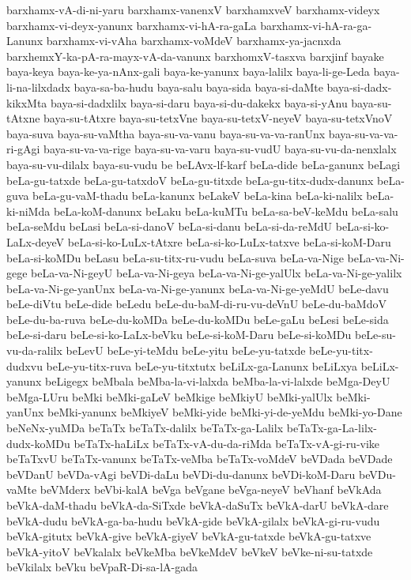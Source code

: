 {barxhamx-vA-di-ni-yaru
barxhamx-vanenxV
barxhamxveV
barxhamx-videyx
barxhamx-vi-deyx-yanunx
barxhamx-vi-hA-ra-gaLa
barxhamx-vi-hA-ra-ga-Lanunx
barxhamx-vi-vAha
barxhamx-voMdeV
barxhamx-ya-jacnxda
barxhemxY-ka-pA-ra-mayx-vA-da-vanunx
barxhomxV-tasxva
barxjinf
bayake
baya-keya
baya-ke-ya-nAnx-gali
baya-ke-yanunx
baya-lalilx
baya-li-ge-Leda
baya-li-na-lilxdadx
baya-sa-ba-hudu
baya-salu
baya-sida
baya-si-daMte
baya-si-dadx-kikxMta
baya-si-dadxlilx
baya-si-daru
baya-si-du-dakekx
baya-si-yAnu
baya-su-tAtxne
baya-su-tAtxre
baya-su-tetxVne
baya-su-tetxV-neyeV
baya-su-tetxVnoV
baya-suva
baya-su-vaMtha
baya-su-va-vanu
baya-su-va-va-ranUnx
baya-su-va-va-ri-gAgi
baya-su-va-va-rige
baya-su-va-varu
baya-su-vudU
baya-su-vu-da-nenxlalx
baya-su-vu-dilalx
baya-su-vudu
be
beLAvx-lf-karf
beLa-dide
beLa-ganunx
beLagi
beLa-gu-tatxde
beLa-gu-tatxdoV
beLa-gu-titxde
beLa-gu-titx-dudx-danunx
beLa-guva
beLa-gu-vaM-thadu
beLa-kanunx
beLakeV
beLa-kina
beLa-ki-nalilx
beLa-ki-niMda
beLa-koM-danunx
beLaku
beLa-kuMTu
beLa-sa-beV-keMdu
beLa-salu
beLa-seMdu
beLasi
beLa-si-danoV
beLa-si-danu
beLa-si-da-reMdU
beLa-si-ko-LaLx-deyeV
beLa-si-ko-LuLx-tAtxre
beLa-si-ko-LuLx-tatxve
beLa-si-koM-Daru
beLa-si-koMDu
beLasu
beLa-su-titx-ru-vudu
beLa-suva
beLa-va-Nige
beLa-va-Ni-gege
beLa-va-Ni-geyU
beLa-va-Ni-geya
beLa-va-Ni-ge-yalUlx
beLa-va-Ni-ge-yalilx
beLa-va-Ni-ge-yanUnx
beLa-va-Ni-ge-yanunx
beLa-va-Ni-ge-yeMdU
beLe-davu
beLe-diVtu
beLe-dide
beLedu
beLe-du-baM-di-ru-vu-deVnU
beLe-du-baMdoV
beLe-du-ba-ruva
beLe-du-koMDa
beLe-du-koMDu
beLe-gaLu
beLesi
beLe-sida
beLe-si-daru
beLe-si-ko-LaLx-beVku
beLe-si-koM-Daru
beLe-si-koMDu
beLe-su-vu-da-ralilx
beLevU
beLe-yi-teMdu
beLe-yitu
beLe-yu-tatxde
beLe-yu-titx-dudxvu
beLe-yu-titx-ruva
beLe-yu-titxtutx
beLiLx-ga-Lanunx
beLiLxya
beLiLx-yanunx
beLigegx
beMbala
beMba-la-vi-lalxda
beMba-la-vi-lalxde
beMga-DeyU
beMga-LUru
beMki
beMki-gaLeV
beMkige
beMkiyU
beMki-yalUlx
beMki-yanUnx
beMki-yanunx
beMkiyeV
beMki-yide
beMki-yi-de-yeMdu
beMki-yo-Dane
beNeNx-yuMDa
beTaTx
beTaTx-dalilx
beTaTx-ga-Lalilx
beTaTx-ga-La-lilx-dudx-koMDu
beTaTx-haLiLx
beTaTx-vA-du-da-riMda
beTaTx-vA-gi-ru-vike
beTaTxvU
beTaTx-vanunx
beTaTx-veMba
beTaTx-voMdeV
beVDada
beVDade
beVDanU
beVDa-vAgi
beVDi-daLu
beVDi-du-danunx
beVDi-koM-Daru
beVDu-vaMte
beVMderx
beVbi-kalA
beVga
beVgane
beVga-neyeV
beVhanf
beVkAda
beVkA-daM-thadu
beVkA-da-SiTxde
beVkA-daSuTx
beVkA-darU
beVkA-dare
beVkA-dudu
beVkA-ga-ba-hudu
beVkA-gide
beVkA-gilalx
beVkA-gi-ru-vudu
beVkA-gitutx
beVkA-give
beVkA-giyeV
beVkA-gu-tatxde
beVkA-gu-tatxve
beVkA-yitoV
beVkalalx
beVkeMba
beVkeMdeV
beVkeV
beVke-ni-su-tatxde
beVkilalx
beVku
beVpaR-Di-sa-lA-gada
}

